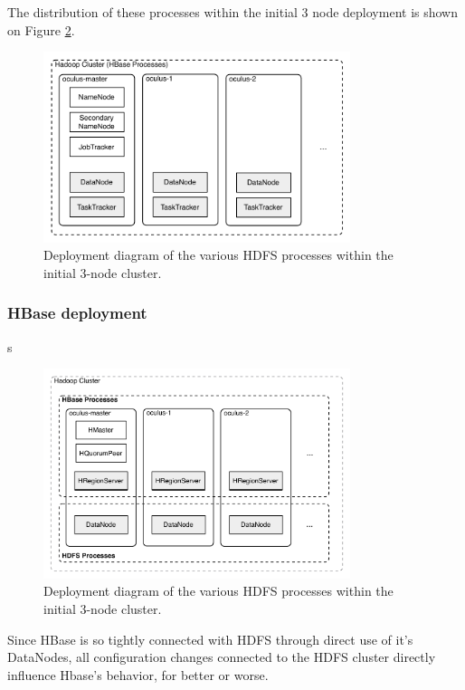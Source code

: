 The distribution of these processes within the initial 3 node deployment is shown on Figure \ref{fig:small-cluster-deployment}.

\begin{figure}[ch!]
  \centering
  \includegraphics[width=0.8\textwidth]{img/hdfs-processes}
  \caption{Deployment diagram of the various HDFS processes within the initial 3-node cluster.}
  \label{fig:small-cluster-deployment}
\end{figure}


\subsubsection{HBase deployment}
\label{sec:hbase-deployment}
s

\begin{figure}[ch!]
  \centering
  \includegraphics[width=0.8\textwidth]{img/hbase-processes}
  \caption{Deployment diagram of the various HDFS processes within the initial 3-node cluster.}
  \label{fig:small-cluster-deployment}
\end{figure}

Since HBase is so tightly connected with HDFS through direct use of it's DataNodes, all configuration changes connected to the HDFS cluster directly influence Hbase's behavior, for better or worse.


